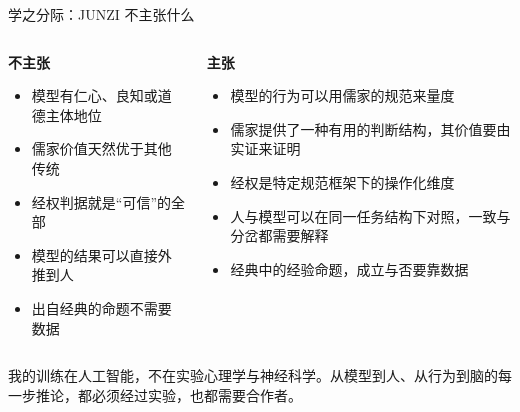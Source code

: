 \documentclass[aspectratio=169,11pt,fontset=fandol]{ctexbeamer}
\newcommand{\hl}[1]{{\bfseries\color{cinnabar}#1}}       %
\newcommand{\hg}[1]{{\bfseries\color{golddeep}#1}}       %
\begin{document}
\begin{frame}[t]{学之分际：JUNZI 不主张什么}
\begin{columns}[T,onlytextwidth]
\begin{caution}
\hl{不主张}\par\vspace{2pt}
\small
\begin{itemize}\setlength{\itemsep}{3pt}
\item 模型有仁心、良知或道德主体地位
\item 儒家价值天然优于其他传统
\item 经权判据就是“可信”的全部
\item 模型的结果可以直接外推到人
\item 出自经典的命题不需要数据
\end{itemize}
\end{caution}
\begin{thesis}
\hg{主张}\par\vspace{2pt}
\small
\begin{itemize}\setlength{\itemsep}{3pt}
\item 模型的行为可以用儒家的规范来量度
\item 儒家提供了一种有用的判断结构，其价值要由实证来证明
\item 经权是特定规范框架下的操作化维度
\item 人与模型可以在同一任务结构下对照，一致与分岔都需要解释
\item 经典中的经验命题，成立与否要靠数据
\end{itemize}
\end{thesis}
\end{columns}
\vspace{4pt}
\begin{remark}
\small 我的训练在人工智能，不在实验心理学与神经科学。从模型到人、从行为到脑的每一步推论，都必须经过实验，也都需要合作者。
\end{remark}
\end{frame}
\end{document}
